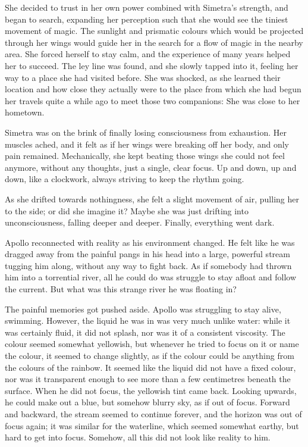 She decided to trust in her own power combined with Simetra's strength, and began to search, expanding her perception such that she would see the tiniest movement of magic. The sunlight and prismatic colours which would be projected through her wings would guide her in the search for a flow of magic in the nearby area. She forced herself to stay calm, and the experience of many years helped her to succeed. The ley line was found, and she slowly tapped into it, feeling her way to a place she had visited before. She was shocked, as she learned their location and how close they actually were to the place from which she had begun her travels quite a while ago to meet those two companions: She was close to her hometown.

\froufrou{}

Simetra was on the brink of finally losing consciousness from exhaustion. Her muscles ached, and it felt as if her wings were breaking off her body, and only pain remained. Mechanically, she kept beating those wings she could not feel anymore, without any thoughts, just a single, clear focus. Up and down, up and down, like a clockwork, always striving to keep the rhythm going. 

As she drifted towards nothingness, she felt a slight movement of air, pulling her to the side; or did she imagine it? Maybe she was just drifting into unconsciousness, falling deeper and deeper. Finally, everything went dark.

\froufrou{}

Apollo reconnected with reality as his environment changed. He felt like he was dragged away from the painful pangs in his head into a large, powerful stream tugging him along, without any way to fight back. As if somebody had thrown him into a torrential river, all he could do was struggle to stay afloat and follow the current. But what was this strange river he was floating in?

The painful memories got pushed aside. Apollo was struggling to stay alive, swimming. However, the liquid he was in was very much unlike water: while it was certainly fluid, it did not splash, nor was it of a consistent viscosity. The colour seemed somewhat yellowish, but whenever he tried to focus on it or name the colour, it seemed to change slightly, as if the colour could be anything from the colours of the rainbow. It seemed like the liquid did not have a fixed colour, nor was it transparent enough to see more than a few centimetres beneath the surface. When he did not focus, the yellowish tint came back. Looking upwards, he could make out a blue, but somehow blurry sky, as if out of focus. Forward and backward, the stream seemed to continue forever, and the horizon was out of focus again; it was similar for the waterline, which seemed somewhat earthy, but hard to get into focus. Somehow, all this did not look like reality to him. 

